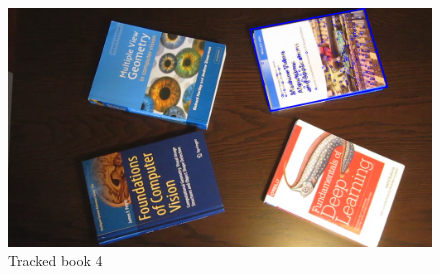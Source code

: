 \documentclass[a4paper,11pt]{article}
\begin{document}
\begin{figure}[ht]
    \centering
    \includegraphics[width=\textwidth]{imgs/TrackedFeatures3.png}
    \caption{Tracked book 4}
    \label{fig:book4}
\end{figure}
\end{document}
